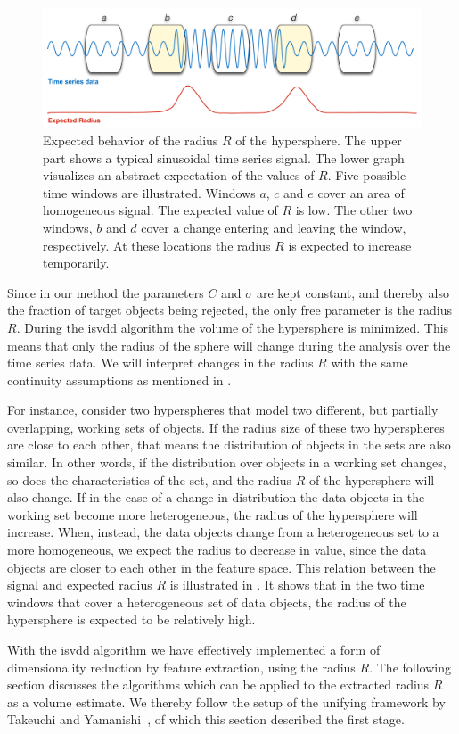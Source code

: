 \begin{figure}
  \centering
    \includegraphics[width=\textwidth,height=\textheight,keepaspectratio]{./Figures/chapter4/expected_behaviour.pdf}
  \caption[Expected radius behavior]{Expected behavior of the radius $R$ of the hypersphere. The upper part shows a typical sinusoidal time series signal. The lower graph visualizes an abstract expectation of the values of $R$. Five possible time windows are illustrated. Windows $a$, $c$ and $e$ cover an area of homogeneous signal. The expected value of $R$ is low. The other two windows, $b$ and $d$ cover a change entering and leaving the window, respectively. At these locations the radius $R$ is expected to increase temporarily.}
  \label{fig:radius_expectation}
\end{figure}

Since in our method the parameters $C$ and $\sigma$ are kept constant, and thereby also the fraction of target objects being rejected, the only free parameter is the radius $R$.
During the \gls{isvdd} algorithm the volume of the hypersphere is minimized.
This means that only the radius of the sphere will change during the analysis over the time series data.
We will interpret changes in the radius $R$ with the same continuity assumptions as mentioned in .

For instance, consider two hyperspheres that model two different, but partially overlapping, working sets of objects.
If the radius size of these two hyperspheres are close to each other, that means the distribution of objects in the sets are also similar.
In other words, if the distribution over objects in a working set changes, so does the characteristics of the set, and the radius $R$ of the hypersphere will also change.
If in the case of a change in distribution the data objects in the working set become more heterogeneous, the radius of the hypersphere will increase.
When, instead, the data objects change from a heterogeneous set to a more homogeneous, we expect the radius to decrease in value, since the data objects are closer to each other in the feature space.
This relation between the signal and expected radius $R$ is illustrated in .
It shows that in the two time windows that cover a heterogeneous set of data objects, the radius of the hypersphere is expected to be relatively high.

With the \gls{isvdd} algorithm we have effectively implemented a form of dimensionality reduction by feature extraction, using the radius $R$.
The following section discusses the algorithms which can be applied to the extracted radius $R$ as a volume estimate.
We thereby follow the setup of the unifying framework by Takeuchi and Yamanishi~\cite{takeuchi2006unifying}, of which this section described the first stage.